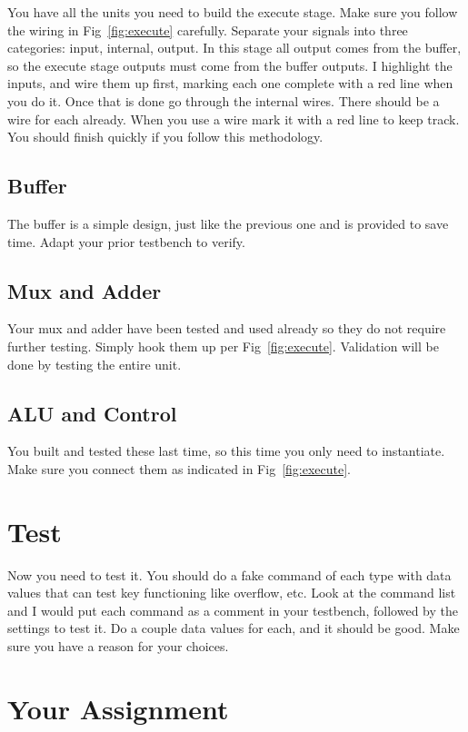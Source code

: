 You have all the units you need to build the execute stage.  Make sure you follow the wiring in Fig~\ref{fig:execute} carefully.  Separate your signals into three categories: input, internal, output.  In this stage all output comes from the buffer, so the execute stage outputs must come from the buffer outputs.  I highlight the inputs, and wire them up first, marking each one complete with a red line when you do it.  Once that is done go through the internal wires.  There should be a wire for each already.  When you use a wire mark it with a red line to keep track.  You should finish quickly if you follow this methodology.

\subsection{Buffer}

The buffer is a simple design, just like the previous one and is provided to save time.  Adapt your prior testbench to verify.

\subsection{Mux and Adder}

Your mux and adder have been tested and used already so they do not require further testing.  Simply hook them up per Fig~\ref{fig:execute}. Validation will be done by testing the entire unit.

\subsection{ALU and Control}

You built and tested these last time, so this time you only need to instantiate.  Make sure you connect them as indicated in Fig~\ref{fig:execute}.

\section{Test}

Now you need to test it.  You should do a fake command of each type with data values that can test key functioning like overflow, etc.  Look at the command list and I would put each command as a comment in your testbench, followed by the settings to test it.  Do a couple data values for each, and it should be good.  Make sure you have a reason for your choices.

\section{Your Assignment}

